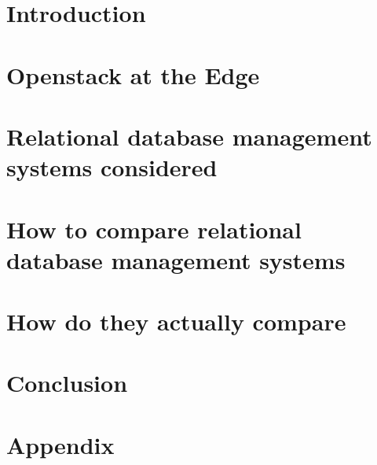 \documentclass[a4paper, 10pt, titlepage]{report}
\begin{document}
\chapter*{Introduction}




\chapter{Openstack at the Edge}
\label{chap:os-edge}




\chapter{Relational database management systems considered}
\label{chap:rdmbs-considered}



\chapter{How to compare relational database management systems}
\label{chap:experiments}



\chapter{How do they actually compare}
\label{chap:results}


\chapter*{Conclusion}



\clearpage
\appendix
\chapter{Appendix}
\label{sec:appendix}



\clearpage
{}
{}


\printbibliography
\end{document}
